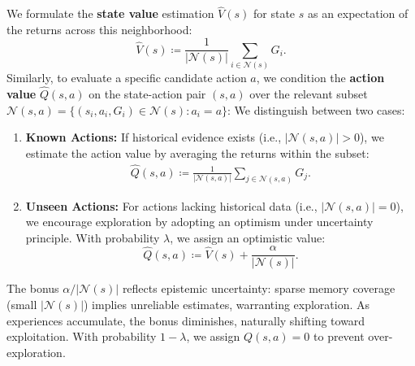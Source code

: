 
We formulate the \textbf{ state value} estimation $\widehat V(s)$ for state $s$ as an expectation of the returns across this neighborhood:
\begin{equation}
       \widehat V(s)\coloneqq \frac{1}{|\mathcal{N}(s)|} \sum_{i \in \mathcal{N}(s)} G_i. %
\end{equation}
Similarly, to evaluate a specific candidate action $a$, we condition the \textbf{action value} $\widehat Q(s,a)$ on the state-action pair $(s,a)$ over the relevant subset $\mathcal{N}(s, a) = \{(s_i, a_i, G_i) \in \mathcal{N}(s) : a_i = a\}$: We distinguish between two cases:

\begin{enumerate}[leftmargin=*, nosep, label=\textbf{\arabic*.}]
\item \textbf{Known Actions:} If historical evidence exists (i.e., $|\mathcal{N}(s, a)| > 0$), we estimate the action value by averaging the returns within the subset:
\begin{equation}
\begin{aligned}
\widehat Q(s,a)\coloneqq \frac{1}{|\mathcal{N}(s,a)|} \sum_{j \in \mathcal{N}(s,a)} G_j.  %
\end{aligned}
\label{eq:value_est}
\end{equation}

\item \textbf{Unseen Actions:} For actions lacking historical data (i.e., $|\mathcal{N}(s, a)| = 0$), we encourage exploration by adopting an optimism under uncertainty principle. With probability $\lambda$, we assign an optimistic value:
\begin{equation}
\widehat Q(s,a) \coloneqq \widehat  V(s) + \frac{\alpha}{|\mathcal{N}(s)|}.
\label{eq:exploration}
\end{equation}
\end{enumerate}
The bonus $\alpha / |\mathcal{N}(s)|$ reflects epistemic uncertainty: sparse memory coverage (small $|\mathcal{N}(s)|$) implies unreliable estimates, warranting exploration. As experiences accumulate, the bonus diminishes, naturally shifting toward exploitation. With probability $1-\lambda$, we assign $Q(s,a) = 0$ to prevent over-exploration.

